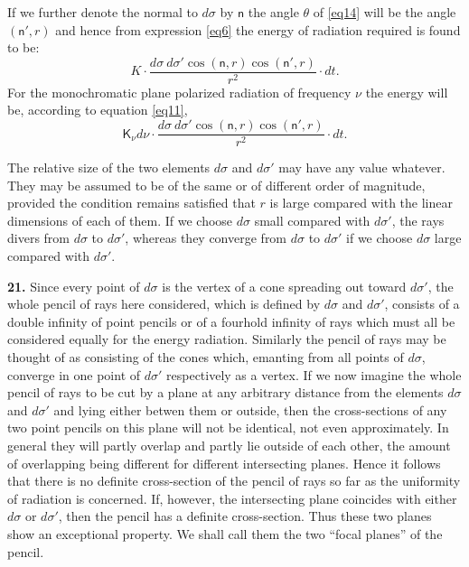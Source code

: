 \documentclass[12pt,oneside]{book}
\begin{document}
If we further denote the normal to $d\sigma$ by $\mathsf{n}$ the angle $\theta$ of \eqref{eq14} will be the angle $(\mathsf{n}',r)$ and hence from expression \eqref{eq6} the energy of radiation required is found to be:
\begin{equation}
    K\cdot\frac{d\sigma\ d\sigma' \cos(\mathsf{n},r)\cos(\mathsf{n}',r)}{r^2}\cdot dt.
    \label{eq17}
\end{equation} 
For the monochromatic plane polarized radiation of frequency $\nu$ the energy will be, according to equation \eqref{eq11},
\begin{equation}
    \mathsf{K}_\nu d\nu\cdot\frac{d\sigma\ d\sigma' \cos(\mathsf{n},r)\cos(\mathsf{n}',r)}{r^2}\cdot dt.
    \label{eq18}
\end{equation} \par 
The relative size of the two elements $d\sigma$ and $d\sigma'$ may have any value whatever. They may be assumed to be of the same or of different order of magnitude, provided the condition remains satisfied that $r$ is large compared with the linear dimensions of each of them. If we choose $d\sigma$ small compared with $d\sigma'$, the rays divers from $d\sigma$ to $d\sigma'$, whereas they converge from $d\sigma$ to $d\sigma'$ if we choose $d\sigma$ large compared with $d\sigma'$. \par 

\textbf{21.} Since every point of $d\sigma$ is the vertex of a cone spreading out toward $d\sigma'$, the whole pencil of rays here considered, which is defined by $d\sigma$ and $d\sigma'$, consists of a double infinity of point pencils or of a fourhold infinity of rays which must all be considered equally for the energy radiation. Similarly the pencil of rays may be thought of as consisting of the cones which, emanting from all points of $d\sigma$, converge in one point of $d\sigma'$ respectively as a vertex. If we now imagine the whole pencil of rays to be cut by a plane at any arbitrary distance from the elements $d\sigma$ and $d\sigma'$ and lying either betwen them or outside, then the cross-sections of any two point pencils on this plane will not be identical, not even approximately. In general they will partly overlap and partly lie outside of each other, the amount of overlapping being different for different intersecting planes. Hence it follows that there is no definite cross-section of the pencil of rays so far as the uniformity of radiation is concerned. If, however, the intersecting plane coincides with either $d\sigma$ or $d\sigma'$, then the pencil has a definite cross-section. Thus these two planes show an exceptional property. We shall call them the two ``focal planes'' of the pencil. \par 
\end{document}
